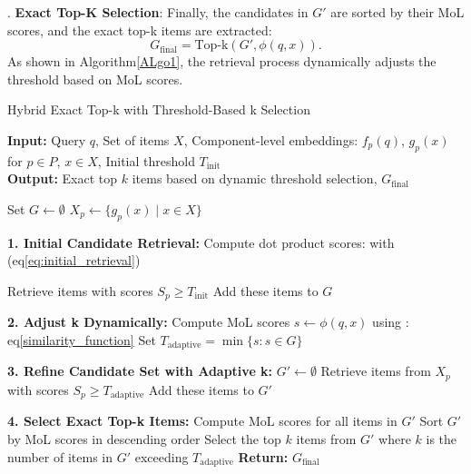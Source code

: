 \documentclass[review]{jair}
\begin{document}
. \textbf{Exact Top-K Selection}:  
Finally, the candidates in \(G'\) are sorted by their MoL scores, and the exact top-k items are extracted:
\begin{equation}
G_{\text{final}} = \text{Top-k}(G', \phi(q, x)).
\end{equation}
As shown in Algorithm\ref{ALgo1}, the retrieval process dynamically adjusts the threshold based on MoL scores.
\begin{algorithm}
	\caption{Hybrid Exact Top-k with Threshold-Based k Selection}
	\label{ALgo1}
	\textbf{Input:} Query $q$, Set of items $X$, Component-level embeddings: $f_p(q)$, $g_p(x)$ for $p \in P$, $x \in X$, Initial threshold $T_{\text{init}}$ \\
	\textbf{Output:} Exact top $k$ items based on dynamic threshold   selection, $G_{\text{final}}$
	
	\begin{algorithmic}[1]
		
		
		\State Set $G \gets \emptyset$     
		\State $X_p \gets \{g_p(x) \mid x \in X\}$ 
		\EndFor
		
		\textbf{1. Initial Candidate Retrieval:}
		\State Compute dot product scores:  with (eq\eqref{eq:initial_retrieval})
		
		\State Retrieve items with scores $S_p \geq T_{\text{init}}$
		\State Add these items to $G$
		\EndFor
		
		\textbf{2. Adjust k Dynamically:}
		\State Compute MoL scores $s \gets \phi(q, x)$ using : eq\eqref{similarity_function}
		\State Set $T_{\text{adaptive}} = \min \{s : s \in G\}$
		\EndFor
		
		\textbf{3. Refine Candidate Set with Adaptive k:}
		\State	$G' \gets \emptyset$
		\State Retrieve items from $X_p$ with scores $S_p \geq T_{\text{adaptive}}$
		\State Add these items to $G'$
		\EndFor
		
		\textbf{4. Select Exact Top-k Items:}
		\State Compute MoL scores for all items in $G'$
		\State Sort $G'$ by MoL scores in descending order
		\State Select the top $k$ items from $G'$ where $k$ is the number of items in $G'$ exceeding $T_{\text{adaptive}}$
		\EndFor
		\State\textbf{ Return:} $G_{\text{final}}$ 
	\end{algorithmic}
\end{algorithm}
\newpage
\end{document}
